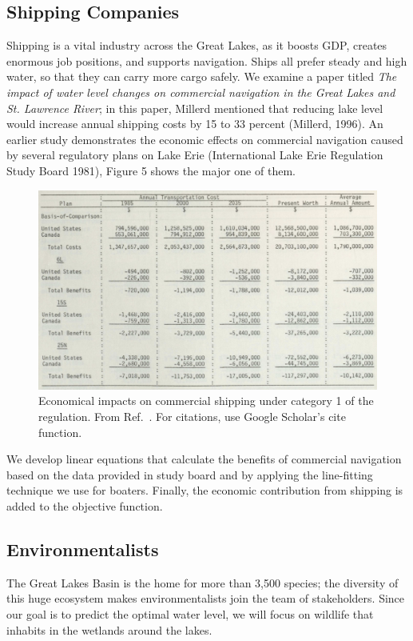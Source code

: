 \documentclass[pre,12pt]{revtex4-1}
\begin{document}
\subsection{Shipping Companies}
Shipping is a vital industry across the Great Lakes, as it boosts GDP, creates enormous job positions, and supports navigation. Ships all prefer steady and high water, so that they can carry more cargo safely. We examine a paper titled \textit{The impact of water level changes on commercial navigation in the Great Lakes and St. Lawrence River}; in this paper, Millerd mentioned that reducing lake level would increase annual shipping costs by 15 to 33 percent (Millerd, 1996). An earlier study demonstrates the economic effects on commercial navigation caused by several regulatory plans on Lake Erie (International Lake Erie Regulation Study Board 1981), Figure 5 shows the major one of them. \par
\begin{figure}[htbp]
\begin{center}
\includegraphics[width=4.5in]{shipping.png}
\caption{Economical impacts on commercial shipping under category 1 of the regulation. From Ref.~\cite{nd97}. For citations, use Google Scholar's cite function.}
\label{leaf}
\end{center}
\end{figure}
We develop linear equations that calculate the benefits of commercial navigation based on the data provided in study board and by applying the line-fitting technique we use for boaters. Finally, the economic contribution from shipping is added to the objective function.

\subsection{Environmentalists}
The Great Lakes Basin is the home for more than 3,500 species; the diversity of this huge ecosystem makes environmentalists join the team of stakeholders. Since our goal is to predict the optimal water level, we will focus on wildlife that inhabits in the wetlands around the lakes.
\end{document}

